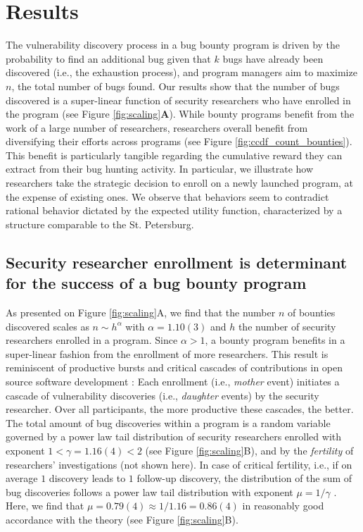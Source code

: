 \section{Results}
\label{sec:results}
The vulnerability discovery process in a bug bounty program is driven by the probability to find an additional bug given that $k$ bugs have already been discovered (i.e., the exhaustion process), and program managers aim to maximize $n$, the total number of bugs found. Our results show that the number of bugs discovered is a super-linear function of security researchers who have enrolled in the program (see Figure \ref{fig:scaling}{\bf A}). While bounty programs benefit from the work of a large number of researchers, researchers overall benefit from diversifying their efforts across programs (see Figure \ref{fig:ccdf_count_bounties}). This benefit is particularly tangible regarding the cumulative reward they can extract from their bug hunting activity. In particular, we illustrate how researchers take the strategic decision to enroll on a newly launched program, at the expense of existing ones. We observe that behaviors seem to contradict rational behavior dictated by the expected utility function, characterized by a structure comparable to the St. Petersburg.
 
\subsection{Security researcher enrollment is determinant for the success of a bug bounty program}
As presented on Figure \ref{fig:scaling}A, we find that the number $n$ of bounties discovered scales as $n \sim h^{\alpha}$ with $\alpha = 1.10(3)$ and $h$ the number of security researchers enrolled in a program. Since $\alpha > 1$, a bounty program benefits in a super-linear fashion from the enrollment of more researchers. This result is reminiscent of productive bursts and critical cascades of contributions in open source software development \cite{sornette2014much}: Each enrollment (i.e., {\it mother} event) initiates a cascade of vulnerability discoveries (i.e., {\it daughter} events) by the security researcher. Over all participants, the more productive these cascades, the better. The total amount of bug discoveries within a program is a random variable governed by a power law tail distribution of security researchers enrolled with exponent $1< \gamma = 1.16(4) < 2$ (see Figure \ref{fig:scaling}B), and by the {\it fertility} of researchers' investigations (not shown here). In case of critical fertility, i.e., if on average $1$ discovery leads to $1$ follow-up discovery, the distribution of the sum of bug discoveries follows a power law tail distribution with exponent $\mu = 1/\gamma$ \cite{sornette2014much}. Here, we find that $\mu = 0.79(4) \approx 1/1.16 = 0.86(4)$ in reasonably good accordance with the theory  (see Figure \ref{fig:scaling}B).\\

